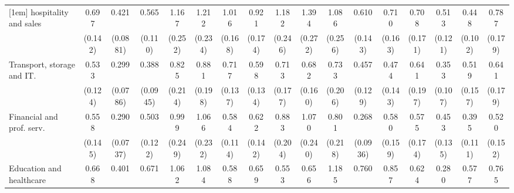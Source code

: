 {\begin{tabular}{l*{16}{c}}
[1em]
hospitality and sales&       0.697         &       0.421\sym{***}&       0.565\sym{**} &       1.167         &       1.212         &       1.016         &       0.921         &       1.182         &       1.394         &       1.086         &       0.610\sym{*}  &       0.710         &       0.708         &       0.513\sym{**} &       0.448\sym{***}&       0.787         \\
                    &     (0.142)         &    (0.0881)         &     (0.110)         &     (0.252)         &     (0.234)         &     (0.168)         &     (0.174)         &     (0.246)         &     (0.272)         &     (0.256)         &     (0.143)         &     (0.163)         &     (0.171)         &     (0.121)         &     (0.102)         &     (0.179)         \\
[1em]
Transport, storage and IT.&       0.533\sym{**} &       0.299\sym{***}&       0.388\sym{***}&       0.825         &       0.881         &       0.717         &       0.598\sym{*}  &       0.713         &       0.682         &       0.733         &       0.457\sym{**} &       0.474\sym{*}  &       0.641         &       0.353\sym{***}&       0.519\sym{*}  &       0.641         \\
                    &     (0.124)         &    (0.0786)         &    (0.0945)         &     (0.214)         &     (0.198)         &     (0.137)         &     (0.134)         &     (0.177)         &     (0.160)         &     (0.206)         &     (0.129)         &     (0.143)         &     (0.197)         &     (0.107)         &     (0.157)         &     (0.179)         \\
[1em]
Financial and prof. serv.&       0.558\sym{*}  &       0.290\sym{***}&       0.503\sym{**} &       0.999         &       1.066         &       0.584\sym{**} &       0.622\sym{*}  &       0.883         &       1.070         &       0.801         &       0.268\sym{***}&       0.580\sym{*}  &       0.575         &       0.453\sym{**} &       0.395\sym{***}&       0.520\sym{*}  \\
                    &     (0.145)         &    (0.0737)         &     (0.122)         &     (0.249)         &     (0.232)         &     (0.114)         &     (0.142)         &     (0.204)         &     (0.240)         &     (0.218)         &    (0.0936)         &     (0.159)         &     (0.174)         &     (0.135)         &     (0.111)         &     (0.152)         \\
[1em]
Education and healthcare&       0.668         &       0.401\sym{***}&       0.671         &       1.062         &       1.084         &       0.588\sym{**} &       0.659         &       0.553\sym{*}  &       0.656         &       1.185         &       0.760         &       0.857         &       0.624         &       0.280\sym{***}&       0.577\sym{*}  &       0.765         \\

\end{tabular}}
